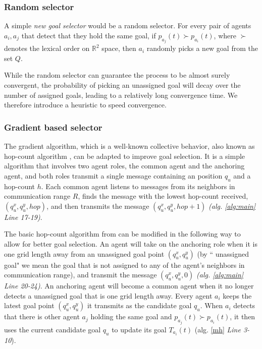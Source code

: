 \documentclass[journal]{IEEEtran}
\begin{document}
\subsubsection{Random selector}
A simple \textit{new goal selector} would be a random selector. For every pair of agents $a_i, a_j$ that detect that they hold the same goal, if $p_{a_j}(t)\succ p_{a_i}(t)$,  where $\succ$ denotes the lexical order on $\mathbb{R}^2$ space, then $a_i$ randomly picks a new goal from the set $Q$. 

While the random selector can guarantee the process to be almost surely convergent, the probability of picking an  unassigned  goal will decay over the number of assigned goals, leading to a relatively long convergence time. We therefore introduce a heuristic to speed convergence.

\subsubsection{Gradient based selector}

The gradient algorithm, which is a well-known collective behavior, also known as hop-count algorithm \cite{mike,mike2},
 can be adapted to improve goal selection. It is a simple algorithm that involves two agent roles, the common agent and the anchoring agent, and both roles transmit a single message containing an position $q_u$ and a hop-count $h$. Each common agent listens to messages from its neighbors in communication range $R$, finds the message with the lowest hop-count received, $(q_u^x,q_u^y,hop)$, and then transmits the message $(q_u^x,q_u^y,hop+1)$ \textit{(alg. \ref{alg:main} \textit{Line 17-19})}.
 
The basic hop-count algorithm from  \cite{mike, mike2} can be modified in the following way to allow for better goal selection. An agent will take on the anchoring role when it is one grid length away from an unassigned goal point $(q_u^x,q_u^y)$ (by `` unassigned  goal" we mean the goal that is not assigned to any of the agent's neighbors in communication range), and transmit the message $(q_u^x,q_u^y,0)$ \textit{(alg. \ref{alg:main} \textit{Line 20-24})}. An anchoring agent will become a common agent when it no longer detects a  unassigned  goal that is one grid length away. Every agent $a_i$ keeps the latest goal point $(q_u^x, q_u^y)$ it transmits as the candidate goal $q_u$. When $a_i$ detects that there is other agent $a_j$ holding the same goal and  $p_{a_j}(t)\succ p_{a_i}(t)$, it then uses the current candidate goal $q_u$ to update its goal $T_{a_i}(t)$ (alg. \ref{mh} \textit{Line 3-10}).
\end{document}
